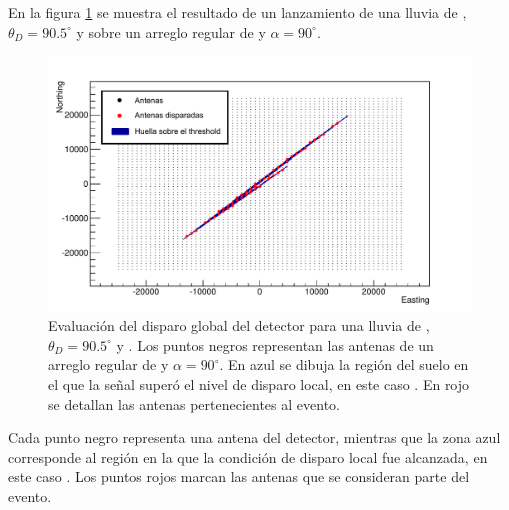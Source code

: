 	En la figura \ref{fig:globalTriggerRadio} se muestra el resultado de un lanzamiento de una lluvia de , $\theta_D=90.5^\circ$ y  sobre un arreglo regular de  y $\alpha=90^\circ$.
	\begin{figure}[h!]
		\begin{center}
			\includegraphics[width=\textwidth]{fig/resultadosRadio/trigger}
			\caption{Evaluaci\'on del disparo global del detector para una lluvia de , $\theta_D=90.5^\circ$ y . Los puntos negros representan las antenas de un arreglo regular de  y $\alpha=90^\circ$. En azul se dibuja la regi\'on del suelo en el que la se\~nal super\'o el nivel de disparo local, en este caso . En rojo se detallan las antenas pertenecientes al evento.}
			\label{fig:globalTriggerRadio}
		\end{center}
	\end{figure}
	Cada punto negro representa una antena del detector, mientras que la zona azul corresponde al regi\'on en la que la condici\'on de disparo local fue alcanzada, en este caso .
	Los puntos rojos marcan las antenas que se consideran parte del evento.
	
